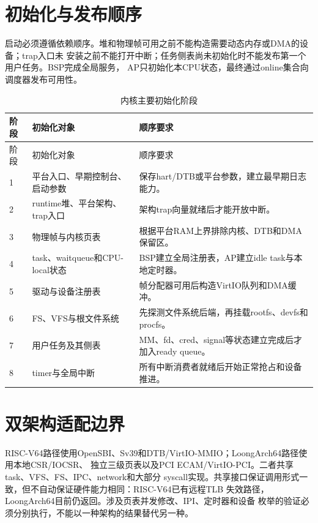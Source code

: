 \section{初始化与发布顺序}

启动必须遵循依赖顺序。堆和物理帧可用之前不能构造需要动态内存或DMA的设备；trap入口未
安装之前不能打开中断；任务侧表尚未初始化时不能发布第一个用户任务。BSP完成全局服务，
AP只初始化本CPU状态，最终通过online集合向调度器发布可用性。

\begin{longtable}{C{1.1cm}L{4.4cm}L{7.7cm}}
  \caption{内核主要初始化阶段}\label{tab:boot-order}\\
  \toprule
  阶段 & 初始化对象 & 顺序要求 \\
  \midrule
  \endfirsthead
  \toprule
  阶段 & 初始化对象 & 顺序要求 \\
  \midrule
   & 平台入口、早期控制台、启动参数 & 保存hart/DTB或平台参数，建立最早期日志能力。\\
  2 & runtime堆、平台架构、trap入口 & 架构trap向量就绪后才能开放中断。\\
  3 & 物理帧与内核页表 & 根据平台RAM上界排除内核、DTB和DMA保留区。\\
  4 & task、waitqueue和CPU-local状态 & BSP建立全局注册表，AP建立idle task与本地定时器。\\
  5 & 驱动与设备注册表 & 帧分配器可用后构造VirtIO队列和DMA缓冲。\\
  6 & FS、VFS与根文件系统 & 先探测文件系统后端，再挂载rootfs、devfs和procfs。\\
  7 & 用户任务及其侧表 & MM、fd、cred、signal等状态建立完成后才加入ready queue。\\
  8 & timer与全局中断 & 所有中断消费者就绪后开始正常抢占和设备推进。\\
  \bottomrule
\end{longtable}

\section{双架构适配边界}

RISC-V64路径使用OpenSBI、Sv39和DTB/VirtIO-MMIO；LoongArch64路径使用本地CSR/IOCSR、
独立三级页表以及PCI ECAM/VirtIO-PCI。二者共享task、VFS、FS、IPC、network和大部分
syscall实现。共享接口保证调用形式一致，但不自动保证硬件能力相同：RISC-V64已有远程TLB
失效路径，LoongArch64目前仍返回。涉及页表并发修改、IPI、定时器和设备
枚举的验证必须分别执行，不能以一种架构的结果替代另一种。

